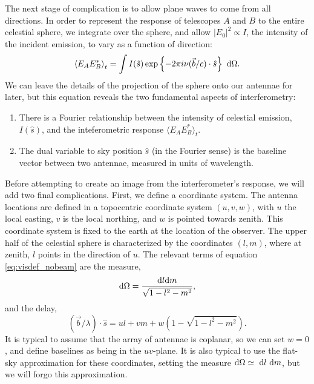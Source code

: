 The next stage of complication is to allow plane waves to come from all directions. In order to
represent the response of telescopes $A$ and $B$ to the entire celestial sphere, we integrate
over the sphere, and allow $|E_0|^2 \propto I$, the intensity of the incident emission, to vary as a
function of direction:
\begin{equation}
  \left\langle E_A E_B^*\right\rangle_t
  = \int I(\hat{s})\exp\left\{-2\pi i\nu(\vec{b}/c)\cdot\hat{s}\right\}\ {\rm d}\Omega.
  \label{eq:visdef_nobeam}
\end{equation}
We can leave the details of the projection of the sphere onto our antennae for later, but this
equation reveals the two fundamental aspects of interferometry:
\begin{enumerate}
  \item There is a Fourier relationship between the intensity of celestial emission, $I(\hat{s})$,
    and the inteferometric response $\langle E_A E_B^*\rangle_t$.
  \item The dual variable to sky position $\hat{s}$ (in the Fourier sense) is the baseline vector
    between two antennae, measured in units of wavelength.
\end{enumerate}

Before attempting to create an image from the interferometer's response, we will add two final
complications. First, we define a coordinate system. The antenna locations are defined in a
topocentric coordinate system $(u,v,w)$, with $u$ the local easting, $v$ is the local northing, 
and $w$ is pointed towards zenith. This coordinate system is fixed to the earth at the location of
the observer. The upper half of the celestial sphere is characterized by the
coordinates $(l,m)$, where at zenith, $l$ points in the direction of $u$. The relevant terms of
equation \ref{eq:visdef_nobeam} are the measure, 
\begin{equation}
  {\rm d}\Omega = \frac{{\rm d}l{\rm d}m}{\sqrt{1-l^2-m^2}}, 
\end{equation}
and the delay,
\begin{equation}
  (\vec{b}/\lambda)\cdot\hat{s} = ul + vm + w(1-\sqrt{1-l^2-m^2}). 
\end{equation}
It is typical to assume that the array of antennae is coplanar, so we can set $w=0$, and define
baselines as being in the $uv$-plane. It is also typical to use the flat-sky approximation for these
coordinates, setting the measure ${\rm d}\Omega \simeq \ \mathrm{d}l\ \mathrm{d}m$, but we will forgo this
approximation.

